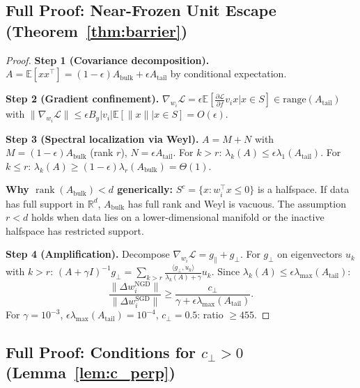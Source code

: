 \documentclass{article}
\providecommand{\R}{\mathbb{R}}
\providecommand{\E}{\mathbb{E}}
\providecommand{\norm}[1]{\lVert #1 \rVert}
\DeclareMathOperator{\rank}{rank}
\theoremstyle{plain}
\theoremstyle{definition}
\theoremstyle{remark}
\begin{document}
\subsection{Full Proof: Near-Frozen Unit Escape (Theorem~\ref{thm:barrier})}

\begin{proof}
\textbf{Step 1 (Covariance decomposition).} $A = \E[xx^\top] = (1-\epsilon)A_{\mathrm{bulk}} + \epsilon A_{\mathrm{tail}}$ by conditional expectation.

\textbf{Step 2 (Gradient confinement).} $\nabla_{w_i}\mathcal{L} = \epsilon\E[\frac{\partial\mathcal{L}}{\partial f}v_i x|x\in S] \in \mathrm{range}(A_{\mathrm{tail}})$ with $\norm{\nabla_{w_i}\mathcal{L}} \leq \epsilon B_y|v_i|\E[\norm{x}|x\in S]=O(\epsilon)$.

\textbf{Step 3 (Spectral localization via Weyl).} $A = M+N$ with $M=(1-\epsilon)A_{\mathrm{bulk}}$ (rank $r$), $N=\epsilon A_{\mathrm{tail}}$. For $k>r$: $\lambda_k(A) \leq \epsilon\lambda_1(A_{\mathrm{tail}})$. For $k\leq r$: $\lambda_k(A) \geq (1-\epsilon)\lambda_r(A_{\mathrm{bulk}})=\Theta(1)$.

\textbf{Why $\rank(A_{\mathrm{bulk}})<d$ generically:} $S^c=\{x:w_i^\top x\leq 0\}$ is a halfspace. If data has full support in $\R^d$, $A_{\mathrm{bulk}}$ has full rank and Weyl is vacuous. The assumption $r<d$ holds when data lies on a lower-dimensional manifold or the inactive halfspace has restricted support.

\textbf{Step 4 (Amplification).} Decompose $\nabla_{w_i}\mathcal{L}=g_\parallel+g_\perp$. For $g_\perp$ on eigenvectors $u_k$ with $k>r$: $(A+\gamma I)^{-1}g_\perp = \sum_{k>r}\frac{\langle g_\perp,u_k\rangle}{\lambda_k(A)+\gamma}u_k$. Since $\lambda_k(A)\leq\epsilon\lambda_{\max}(A_{\mathrm{tail}})$:
\begin{equation}
    \frac{\norm{\Delta w_i^{\mathrm{NGD}}}}{\norm{\Delta w_i^{\mathrm{SGD}}}} \geq \frac{c_\perp}{\gamma+\epsilon\lambda_{\max}(A_{\mathrm{tail}})}.
\end{equation}
For $\gamma=10^{-3}$, $\epsilon\lambda_{\max}(A_{\mathrm{tail}})=10^{-4}$, $c_\perp=0.5$: ratio $\geq 455$.
\end{proof}

\subsection{Full Proof: Conditions for $c_\perp>0$ (Lemma~\ref{lem:c_perp})}
\end{document}
